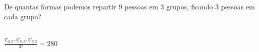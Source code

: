 \begin{ex}
 De quantas formas podemos repartir 9 pessoas em 3 grupos, ficando 3 pessoas em cada grupo?
   \begin{sol}
     \phantom{A} \\
     $\frac{\mathrm{C}_{9,3}\cdot\mathrm{C}_{6,3}\cdot\mathrm{C}_{3,3}}{3!}=280$
    
   \end{sol}
\end{ex}